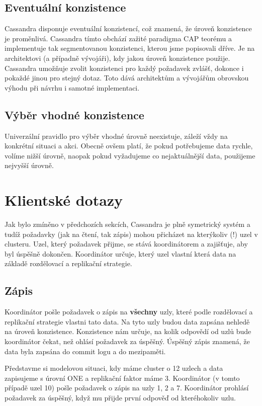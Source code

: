 \subsection{Eventuální konzistence}
Cassandra disponuje eventuální konzistencí, což znamená, že úroveň konzistence je proměnlivá. Cassandra tímto obchází zažité paradigma CAP teorému a implementuje tak segmentovanou konzistenci, kterou jsme popisovali dříve. Je na architektovi (a případně vývojáři), kdy jakou úroveň konzistence použije. Cassandra umožňuje zvolit konzistenci pro každý požadavek zvlášť, dokonce i pokaždé jinou pro stejný dotaz. Toto dává architektům a vývojářům obrovskou výhodu při návrhu i samotné implementaci. 

\subsection{Výběr vhodné konzistence}
Univerzální pravidlo pro výběr vhodné úrovně neexistuje, záleží vždy na konkrétní situaci a akci. Obecně ovšem platí, že pokud potřebujeme data rychle, volíme nižší úrovně, naopak pokud vyžadujeme co nejaktuálnější data, použijeme nejvyšší úrovně. 

\section{Klientské dotazy}
Jak bylo zmíněno v předchozích sekcích, Cassandra je plně symetrický systém a tudíž požadavky (jak na čtení, tak zápis) mohou přicházet na kterýkoliv (!) uzel v clusteru. Uzel, který požadavek přijme, se stává koordinátorem a zajišťuje, aby byl úspěšně dokončen. Koordinátor určuje, který uzel vlastní která data na základě rozdělovací a replikační strategie. 

\subsection{Zápis}
Koordinátor pošle požadavek o zápis na \textbf{všechny} uzly, které podle rozdělovací a replikační strategie vlastni tato data. Na tyto uzly budou data zapsána nehledě na úroveň konzistence. Konzistence nám určuje, na kolik odpovědí od uzlů bude koordinátor čekat, než ohlásí požadavek za úspěšný. Úspěšný zápis znamená, že data byla zapsána do commit logu a do mezipaměti. 

Představme si modelovou situaci, kdy máme cluster o 12 uzlech a data zapisujeme s úrovní ONE a replikační faktor máme 3. Koordinátor (v tomto případě uzel 10) pošle požadavek o zápis na uzly 1, 2 a 7. Koordinátor prohlásí požadavek za úspěšný, když mu přijde první odpověď od kteréhokoliv uzlu.

